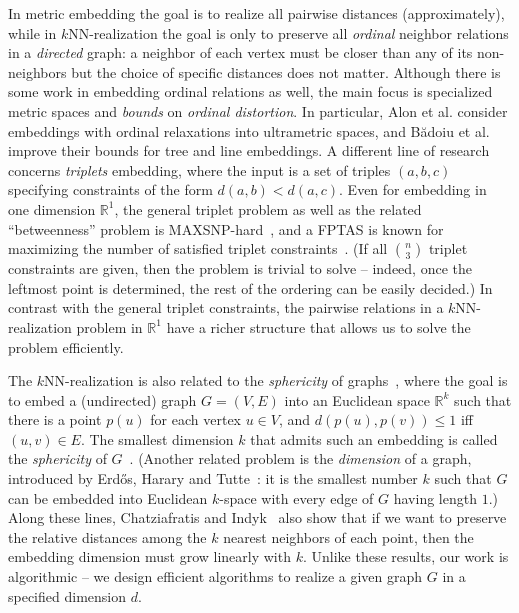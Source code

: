 \documentclass[11pt]{article}
\begin{document}
In metric embedding the goal is to realize all pairwise distances (approximately), while in $k$NN-realization the goal is only to preserve all \emph{ordinal} neighbor relations in a \emph{directed} graph: a neighbor of each vertex must be closer than any of its non-neighbors but the choice of specific distances does not matter.
Although  there is some work in embedding ordinal relations as well, the main focus is specialized metric spaces and \emph{bounds} on \emph{ordinal distortion}.
In particular, Alon et al. \cite{alon2008} consider embeddings with ordinal relaxations into ultrametric spaces, and Bădoiu et al. \cite{badoiu2008} improve their bounds for tree and line embeddings.
A different line of research concerns \emph{triplets} embedding, where the input is a set of triples $(a, b, c)$ specifying constraints of the form $d(a, b) < d(a, c)$.
Even for embedding in one dimension $\mathbb{R}^1$, the general triplet problem as well as the related ``betweenness'' problem is MAXSNP-hard~\cite{ChorSudan}, and a FPTAS is known for maximizing the number of satisfied triplet constraints~\cite{fan2020}.
(If all $\binom{n}{3}$ triplet constraints are given, then the problem is trivial to solve -- indeed, once the leftmost point is determined, the rest of the ordering can be easily decided.)
In contrast with the general triplet constraints, the pairwise relations in a $k$NN-realization problem in $\mathbb{R}^1$ have a richer structure that allows us to solve the problem efficiently. 

The $k$NN-realization is also related to the \emph{sphericity} of graphs~\cite{maehara:1984}, where the goal is to embed a (undirected) graph $G=(V,E)$ into an Euclidean space $\mathbb{R}^k$ such that there is a point $p(u)$ for each vertex $u \in V$, and $d(p(u), p(v)) \leq 1$ iff $(u, v) \in E$.  The smallest dimension $k$ that admits such an embedding is called the \emph{sphericity} of $G$~\cite{maehara:1984}. (Another related problem is the \emph{dimension} of a graph, introduced by Erd\H{o}s, Harary and Tutte~\cite{erdos:65}: it is the smallest number $k$ such that $G$ can be embedded into Euclidean $k$-space with every edge of $G$ having length $1$.) Along these lines, Chatziafratis and Indyk~\cite{chatziafratis2024} also show that if we want to preserve the relative distances among the $k$ nearest neighbors of each point, then the embedding dimension must grow linearly with $k$. Unlike these results, our work is algorithmic -- we design efficient algorithms to realize a given graph $G$ in a specified dimension $d$.
\end{document}
